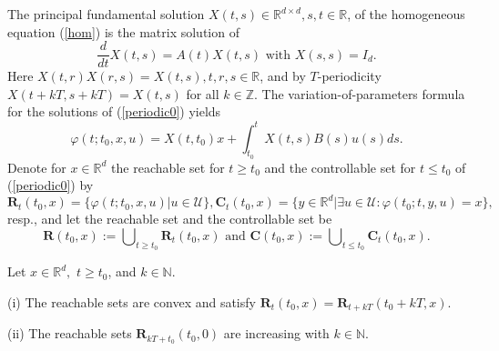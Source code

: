 \documentclass{siamltex}%
\begin{document}
The principal fundamental solution $X(t,s)\in\mathbb{R}^{d\times d}%
,s,t\in\mathbb{R}$, of the homogeneous equation (\ref{hom}) is the matrix
solution of
\[
\frac{d}{dt}X(t,s)=A(t)X(t,s)\text{ with }X(s,s)=I_{d}.
\]
Here $X(t,r)X(r,s)=X(t,s),t,r,s\in\mathbb{R}$, and by $T$-periodicity
$X(t+kT,s+kT)=X(t,s)$ for all $k\in\mathbb{Z}$. The variation-of-parameters
formula for the solutions of (\ref{periodic0}) yields%
\begin{equation}
\varphi(t;t_{0},x,u)=X(t,t_{0})x+\int_{t_{0}}^{t}X(t,s)B(s)u(s)ds. \label{VdP}%
\end{equation}
Denote for $x\in\mathbb{R}^{d}$ the reachable set for $t\geq t_{0}$ and the
controllable set for $t\leq t_{0}$ of (\ref{periodic0}) by
\begin{equation}
\mathbf{R}_{t}(t_{0},x)=\{\varphi(t;t_{0},x,u)\left\vert u\in\mathcal{U}%
\right.  \},\mathbf{C}_{t}(t_{0},x)=\{y\in\mathbb{R}^{d}\left\vert \exists
u\in\mathcal{U}:\varphi(t_{0};t,y,u)=x\right.  \}, \label{C1}%
\end{equation}
resp., and let the reachable set and the controllable set be%
\[
\mathbf{R}(t_{0},x):=\bigcup\nolimits_{t\geq t_{0}}\mathbf{R}_{t}%
(t_{0},x)\text{ and }\mathbf{C}(t_{0},x):=\bigcup\nolimits_{t\leq t_{0}%
}\mathbf{C}_{t}(t_{0},x).
\]


\begin{lemma}
\label{Lemma1}Let $x\in\mathbb{R}^{d},$ $t\geq t_{0}$, and $k\in\mathbb{N}$.

(i) The reachable sets are convex and satisfy $\mathbf{R}_{t}(t_{0}%
,x)=\mathbf{R}_{t+kT}(t_{0}+kT,x)$.

(ii) The reachable sets $\mathbf{R}_{kT+t_{0}}(t_{0},0)$ are increasing with
$k\in\mathbb{N}$.
\end{lemma}
\end{document}
